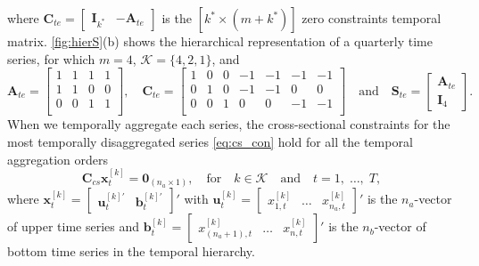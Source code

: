 \documentclass[a4paper,11pt]{article}
\newcommand{\bvet}{\bm{b}}
\newcommand{\uvet}{\bm{u}}
\newcommand{\xvet}{\bm{x}}
\newcommand{\Avet}{\bm{A}}
\newcommand{\Cvet}{\bm{C}}
\newcommand{\Ivet}{\bm{I}}
\newcommand{\Svet}{\bm{S}}
\newcommand{\Zerovet}{\bm{0}}
\theoremstyle{definition}
\begin{document}
where $\Cvet_{te} = \begin{bmatrix}\Ivet_{k^\ast} & -\Avet_{te}\end{bmatrix}$ is the $\left[k^\ast \times (m+k^\ast)\right]$ zero constraints temporal matrix.
\autoref{fig:hierS}(b) shows the hierarchical representation of a quarterly time series, for which $m = 4$, $\mathcal{K} = \{4,2,1\}$, and
$$
	\Avet_{te} = \begin{bmatrix}
		1 & 1 & 1 & 1 \\
		1 & 1 & 0 & 0 \\
		0 & 0 & 1 & 1 \\
	\end{bmatrix}, \quad \Cvet_{te} = \begin{bmatrix}
		1 & 0 & 0 & -1 & -1 & -1 & -1 \\
		0 & 1 & 0 & -1 & -1 & 0  & 0  \\
		0 & 0 & 1 & 0  & 0  & -1 & -1 \\
	\end{bmatrix} \quad \mathrm{and} \quad \Svet_{te} = \begin{bmatrix}
		\Avet_{te} \\
		\Ivet_4
	\end{bmatrix}.
$$
When we temporally aggregate each series, the cross-sectional constraints for the most temporally disaggregated series \eqref{eq:cs_con} hold for all the temporal aggregation orders
\begin{equation}
	\label{eq:cs_con2}
	\Cvet_{cs}\xvet^{[k]}_t = \Zerovet_{(n_a \times 1)}, \quad \mathrm{for} \quad k \in \mathcal{K} \quad \mathrm{and} \quad t = 1, \;\dots, \;T,
\end{equation}
where $\xvet_t^{[k]} = \begin{bmatrix}
		\uvet_t^{[k]\prime} & \bvet_t^{[k]\prime}
	\end{bmatrix}'$ with $\uvet^{[k]}_t = \begin{bmatrix} x^{[k]}_{1,t} & \dots & x^{[k]}_{n_a,t}
	\end{bmatrix}'$ is the $n_a$-vector of upper time series and $\bvet^{[k]}_t = \begin{bmatrix} x^{[k]}_{(n_a+1),t} & \dots & x^{[k]}_{n,t} \end{bmatrix}'$ is the $n_b$-vector of bottom time series in the temporal hierarchy.
\end{document}
